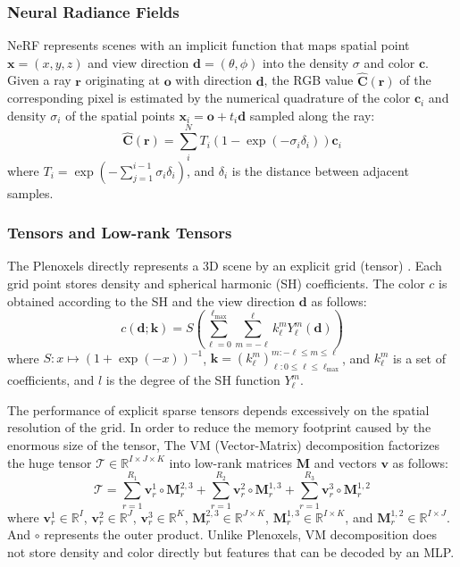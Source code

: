 \documentclass[letterpaper]{article} \usepackage{aaai23}  \usepackage{times}  \usepackage{helvet}  \usepackage{courier}  \usepackage[hyphens]{url}  \usepackage{graphicx} \urlstyle{rm} \def\UrlFont{\rm}  \usepackage{natbib}  \usepackage{caption} \frenchspacing  \setlength{\pdfpagewidth}{8.5in}  \setlength{\pdfpageheight}{11in}  \usepackage{multirow}
\begin{document}
\subsubsection{Neural Radiance Fields}
NeRF represents scenes with an implicit function that maps spatial point $\mathbf{x}=(x, y, z)$ and view direction $\mathbf{d}=(\theta, \phi)$ into the density $\sigma$ and color $\mathbf{c}$. Given a ray $\mathbf{r}$ originating at $\mathbf{o}$ with direction $\mathbf{d}$, the RGB value $\hat{\mathbf{C}}(\mathbf{r})$ of the corresponding pixel is estimated by the numerical quadrature of the color $\mathbf{c}_i$ and density $\sigma_i$ of the spatial points $\mathbf{x}_i=\mathbf{o}+t_i\mathbf{d}$ sampled along the ray:
\begin{equation}  \label{neural_rendering_equation}
    \hat{\mathbf{C}}(\mathbf{r}) = \sum_{i}^{N}T_i(1-\exp(-\sigma_i \delta_i))\mathbf{c}_i
\end{equation}
where $T_i = \exp(- \sum_{j=1}^{i-1} \sigma_i \delta_i)$, and $\delta_i$ is the distance between adjacent samples. 


\subsubsection{Tensors and Low-rank Tensors} The Plenoxels directly represents a 3D scene by an explicit grid (tensor) \cite{fridovich2022plenoxels}. Each grid point stores density and spherical harmonic (SH) coefficients. The color $c$ is obtained according to the SH and the view direction $\mathbf{d}$ as follows:
\begin{equation}  \label{eq-sh}
c(\mathbf{d} ; \mathbf{k})=S\left(\sum_{\ell=0}^{\ell_{\max }} \sum_{m=-\ell}^{\ell} k_{\ell}^{m} Y_{\ell}^{m}(\mathbf{d})\right)
\end{equation}
where $S: x \mapsto(1+\exp (-x))^{-1}$, $\mathbf{k}=\left(k_{\ell}^{m}\right)_{\ell: 0 \leq \ell \leq \ell_{\max }}^{m:-\ell \leq m \leq \ell}$,  and $k_{\ell}^{m}$ is a set of coefficients, and $l$ is the degree of the SH function $Y_{\ell}^{m}$.


The performance of explicit sparse tensors depends excessively on the spatial resolution of the grid. In order to reduce the memory footprint caused by the enormous size of the tensor, The VM (Vector-Matrix) \cite{chen2022tensorf} decomposition factorizes the huge tensor $\mathcal{T} \in \mathbb{R}^{I \times J \times K}$ into low-rank matrices $\mathbf{M}$ and vectors $\mathbf{v}$ as follows:
\begin{equation}  \label{eq-vm}
\mathcal{T}=\sum_{r=1}^{R_{1}} \mathbf{v}_{r}^{1} \circ \mathbf{M}_{r}^{2,3}+\sum_{r=1}^{R_{2}} \mathbf{v}_{r}^{2} \circ \mathbf{M}_{r}^{1,3}+\sum_{r=1}^{R_{3}} \mathbf{v}_{r}^{3} \circ \mathbf{M}_{r}^{1,2}
\end{equation}
where $\mathbf{v}_{r}^{1} \in \mathbb{R}^{I}$, $\mathbf{v}_{r}^{2} \in \mathbb{R}^{J}$, $\mathbf{v}_{r}^{3} \in \mathbb{R}^{K}$, $\mathbf{M}_{r}^{2,3} \in \mathbb{R}^{J \times K}$, $\mathbf{M}_{r}^{1,3} \in \mathbb{R}^{I \times K}$, and $\mathbf{M}_{r}^{1,2} \in \mathbb{R}^{I \times J}$. And $\circ$ represents the outer product. Unlike Plenoxels, VM decomposition does not store density and color directly but features that can be decoded by an MLP.
\end{document}
